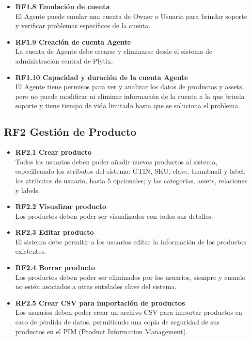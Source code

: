 \documentclass[12pt.a4paper]{article}
\begin{document}
\begin{itemize}
    \item \textbf{RF1.8 Emulación de cuenta} \\
    El Agente puede emular una cuenta de Owner o Usuario para brindar soporte y verificar problemas específicos de la cuenta.

    \item \textbf{RF1.9 Creación de cuenta Agente} \\
    La cuenta de Agente debe crearse y eliminarse desde el sistema de administración central de Plytix.


    \item \textbf{RF1.10 Capacidad y duración de la cuenta Agente} \\
    El Agente tiene permisos para ver y analizar los datos de productos y assets, pero no puede modificar ni eliminar información de la cuenta a la que brinda soporte y tiene tiempo de vida limitado hasta que se soluciona el problema.
\end{itemize}

\subsection*{RF2 Gestión de Producto}

\begin{itemize}
    \item \textbf{RF2.1 Crear producto} \\
    Todos los usuarios deben poder añadir nuevos productos al sistema, especificando los atributos del sistema: GTIN, SKU, clave, thumbnail y label; los atributos de usuario, hasta 5 opcionales; y las categorías, assets, relaciones y labels.

    \item \textbf{RF2.2 Visualizar producto} \\
    Los productos deben poder ser visualizados con todos sus detalles.

    \item \textbf{RF2.3 Editar producto} \\
    El sistema debe permitir a los usuarios editar la información de los productos existentes.

    \item \textbf{RF2.4 Borrar producto} \\
    Los productos deben poder ser eliminados por los usuarios, siempre y cuando no estén asociados a otras entidades clave del sistema.

    \item \textbf{RF2.5 Crear CSV para importación de productos} \\
    Los usuarios deben poder crear un archivo CSV para importar productos en caso de pérdida de datos, permitiendo una copia de seguridad de sus productos en el PIM (Product Information Management).
\end{itemize}
\end{document}

